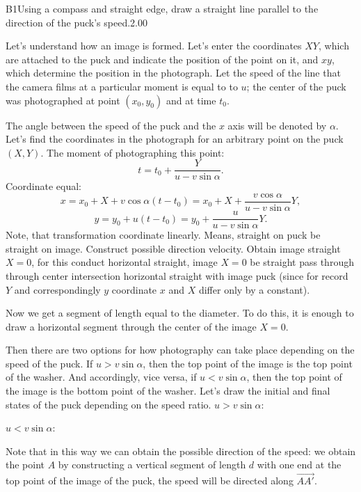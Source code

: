 \documentclass[11pt,a4paper]{article}
\begin{document}
\begin{solcard}{B1}{Using a compass and straight edge, draw a straight line parallel to the direction of the puck's speed.}{2.00}

Let's understand how an image is formed. Let's enter the coordinates $XY$, which are attached to the puck and indicate the position of the point on it, and $xy$, which determine the position in the photograph. Let the speed of the line that the camera films at a particular moment is equal to to $u$; the center of the puck was photographed at point $(x_0,y_0)$ and at time $t_0$.


The angle between the speed of the puck and the $x$ axis will be denoted by $\alpha$. Let's find the coordinates in the photograph for an arbitrary point on the puck $(X,Y)$. The moment of photographing this point: $$t = t_0 + \frac{Y}{u-v\sin\alpha}.$$Coordinate equal: $$x = x_0 + X + v\cos\alpha\left(t-t_0\right) = x_0+X+\frac{v\cos\alpha}{u-v\sin\alpha}Y,$$$$y = y_0 + u\left(t-t_0\right) = y_0+\frac{u}{u-v\sin\alpha}Y.$$Note, that transformation coordinate linearly. Means, straight on puck be straight on image. Construct possible direction velocity. Obtain image straight $X=0$, for this conduct horizontal straight, image $X = 0$ be straight pass through through center intersection horizontal straight with image puck (since for record $Y$ and correspondingly $y$ coordinate $x$ and $X$ differ only by a constant).


Now we get a segment of length equal to the diameter. To do this, it is enough to draw a horizontal segment through the center of the image $X=0$.


Then there are two options for how photography can take place depending on the speed of the puck. If $u > v\sin\alpha$, then the top point of the image is the top point of the washer. And accordingly, vice versa, if $u < v\sin\alpha$, then the top point of the image is the bottom point of the washer. Let's draw the initial and final states of the puck depending on the speed ratio. $u > v\sin\alpha:$


$u < v\sin\alpha:$


Note that in this way we can obtain the possible direction of the speed: we obtain the point $A$ by constructing a vertical segment of length $d$ with one end at the top point of the image of the puck, the speed will be directed along $\overrightarrow{AA'}$.


\end{solcard}
\end{document}
